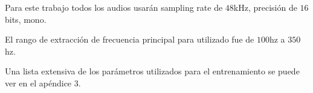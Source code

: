 Para este trabajo todos los audios usarán sampling rate de $48$kHz, precisión de $16$bits, mono.

El rango de extracción de frecuencia principal para  utilizado fue de $100$hz a $350$hz.

Una lista extensiva de los parámetros utilizados para el entrenamiento se puede ver en el apéndice $3$.

